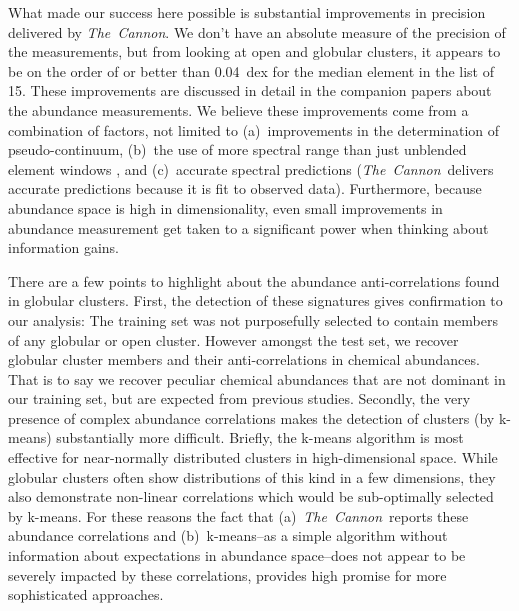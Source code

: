 \documentclass[12pt, letterpaper, preprint]{aastex}
\newcommand{\project}[1]{\textsl{#1}}
\newcommand{\thecannon}{\project{The~Cannon}}
\begin{document}
What made our success here possible is substantial improvements in precision
delivered by \thecannon.
We don't have an absolute measure of the precision of the measurements,
but from looking at open and globular clusters, it appears to be on the
order of or better than 0.04~dex for the median element in the list of 15.
These improvements are discussed in detail in the companion papers
\citep{casey16, ness16} about the abundance measurements.
We believe these improvements come from a combination of factors, not
limited to (a)~improvements in the determination of pseudo-continuum,
(b)~the use of more spectral range than just unblended element windows
\citep{aspcap}, and (c)~accurate spectral predictions
(\thecannon\ delivers accurate predictions because it is fit to
observed data). 
Furthermore, because abundance space is high in dimensionality, even
small improvements in abundance measurement get taken to a significant
power when thinking about information gains.

There are a few points to highlight about the abundance anti-correlations
found in globular clusters. First, the detection of these signatures gives
confirmation to our analysis: The training set was not purposefully selected
to contain members of any globular or open cluster. However amongst the test
set, we recover globular cluster members and their anti-correlations 
in chemical abundances. That is to
say we recover peculiar chemical abundances that are not dominant in our
training set, but are expected from previous studies. Secondly, the very
presence of complex abundance correlations makes the detection of clusters
(by k-means) substantially more difficult. Briefly, the k-means algorithm
is most effective for near-normally distributed clusters in high-dimensional space.
While globular clusters often show distributions of this kind in a few dimensions, they also demonstrate non-linear correlations which would be
sub-optimally selected by k-means. For these reasons the fact that (a)~\thecannon\
reports these abundance correlations and (b)~k-means--as a simple algorithm without information about expectations in abundance space--does not appear to be
severely impacted by these correlations, provides high promise for more sophisticated approaches.
\end{document}
